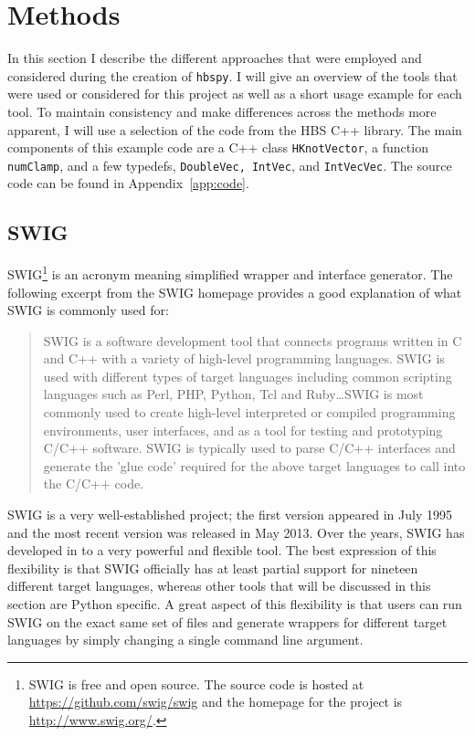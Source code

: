 
\section{Methods} \label{sec:methods}

In this section I describe the different approaches that were employed and considered during the creation of \texttt{hbspy}. I will give an overview of the tools that were used or considered for this project as well as a short usage example for each tool. To maintain consistency and make differences across the methods more apparent, I will use a selection of the code from the HBS C++ library. The main components of this example code are a C++ class \texttt{HKnotVector}, a function \texttt{numClamp}, and a few typedefs, \texttt{DoubleVec, IntVec}, and \texttt{IntVecVec}. The source code can be found in Appendix~\ref{app:code}.

\subsection{SWIG} \label{sub:swig}

  SWIG\footnote{SWIG is free and open source. The source code is hosted at \url{https://github.com/swig/swig} and the homepage for the project is \url{http://www.swig.org/}.} is an acronym meaning simplified wrapper and interface generator. The following excerpt from the SWIG homepage provides a good explanation of what SWIG is commonly used for:

  \begin{quote}
    SWIG is a software development tool that connects programs written in C and C++ with a variety of high-level programming languages. SWIG is used with different types of target languages including common scripting languages such as Perl, PHP, Python, Tcl and Ruby\ldots SWIG is most commonly used to create high-level interpreted or compiled programming environments, user interfaces, and as a tool for testing and prototyping C/C++ software. SWIG is typically used to parse C/C++ interfaces and generate the 'glue code' required for the above target languages to call into the C/C++ code.
  \end{quote}
  \mainstretch{}

  \noindent  SWIG is a very well-established project; the first version appeared in July 1995 and the most recent version was released in May 2013. Over the years, SWIG has developed in to a very powerful and flexible tool. The best expression of this flexibility is that SWIG officially has at least partial support for nineteen different target languages, whereas other tools that will be discussed in this section are Python specific. A great aspect of this flexibility is that users can run SWIG on the exact same set of files and generate wrappers for different target languages by simply changing a single command line argument.

